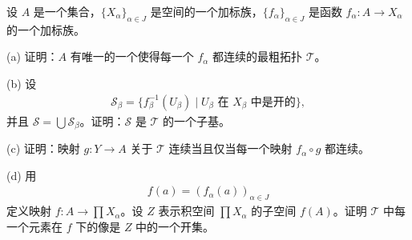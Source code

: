 \documentclass[../../main.tex]{subfiles}
\begin{document}
\begin{exercise}\label{exercise:ch02-积拓扑-10}
设 $A$ 是一个集合，$\{X_{\alpha}\}_{\alpha \in J}$ 是空间的一个加标族，$\{f_{\alpha}\}_{\alpha \in J}$ 是函数 $f_{\alpha}: A \rightarrow X_{\alpha}$ 的一个加标族。

(a) 证明：$A$ 有唯一的一个使得每一个 $f_{\alpha}$ 都连续的最粗拓扑 $\mathcal{T}$。

(b) 设
\begin{align*}
\mathcal{S}_{\beta} = \{f_{\beta}^{-1}(U_{\beta}) \mid U_{\beta} \text{ 在 } X_{\beta} \text{ 中是开的}\},
\end{align*}
并且 $\mathcal{S} = \bigcup \mathcal{S}_{\beta}$。证明：$\mathcal{S}$ 是 $\mathcal{T}$ 的一个子基。

(c) 证明：映射 $g: Y \rightarrow A$ 关于 $\mathcal{T}$ 连续当且仅当每一个映射 $f_{\alpha} \circ g$ 都连续。

(d) 用
\begin{align*}
f(a) = (f_{\alpha}(a))_{\alpha \in J}
\end{align*}
定义映射 $f: A \rightarrow \prod X_{\alpha}$。设 $Z$ 表示积空间 $\prod X_{\alpha}$ 的子空间 $f(A)$。证明 $\mathcal{T}$ 中每一个元素在 $f$ 下的像是 $Z$ 中的一个开集。
\end{exercise}
\end{document}
